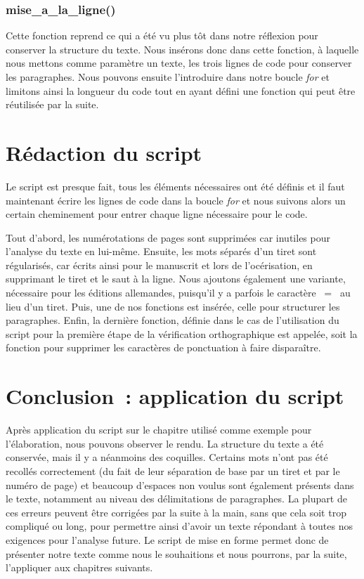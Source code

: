 \subsubsection{mise\_a\_la\_ligne()}
Cette fonction reprend ce qui a été vu plus tôt dans notre réflexion pour conserver la structure du texte. Nous insérons donc dans cette fonction, à laquelle nous mettons comme paramètre un texte, les trois lignes de code pour conserver les paragraphes. Nous pouvons ensuite l'introduire dans notre boucle \emph{for} et limitons ainsi la longueur du code tout en ayant défini une fonction qui peut être réutilisée par la suite.

\section{Rédaction du script}
Le script est presque fait, tous les éléments nécessaires ont été définis et il faut maintenant écrire les lignes de code dans la boucle \emph{for} et nous suivons alors un certain cheminement pour entrer chaque ligne nécessaire pour le code.

Tout d'abord, les numérotations de pages sont supprimées car inutiles pour l'analyse du texte en lui-même. Ensuite, les mots séparés d'un tiret sont régularisés, car écrits ainsi pour le manuscrit et lors de l'océrisation, en supprimant le tiret et le saut à la ligne. Nous ajoutons également une variante, nécessaire pour les éditions allemandes, puisqu'il y a parfois le caractère  \og~=~\fg{} au lieu d'un tiret. Puis, une de nos fonctions est insérée, celle pour structurer les paragraphes. Enfin, la dernière fonction, définie dans le cas de l'utilisation du script pour la première étape de la vérification orthographique est appelée, soit la fonction pour supprimer les caractères de ponctuation à faire disparaître.

\section*{Conclusion~: application du script}
Après application du script sur le chapitre utilisé comme exemple pour l'élaboration, nous pouvons observer le rendu. La structure du texte a été conservée, mais il y a néanmoins des coquilles. Certains mots n'ont pas été recollés correctement (du fait de leur séparation de base par un tiret et par le numéro de page) et beaucoup d'espaces non voulus sont également présents dans le texte, notamment au niveau des délimitations de paragraphes. La plupart de ces erreurs peuvent être corrigées par la suite à la main, sans que cela soit trop compliqué ou long, pour permettre ainsi d'avoir un texte répondant à toutes nos exigences pour l'analyse future.
Le script de mise en forme permet donc de présenter notre texte comme nous le souhaitions et nous pourrons, par la suite, l'appliquer aux chapitres suivants.
